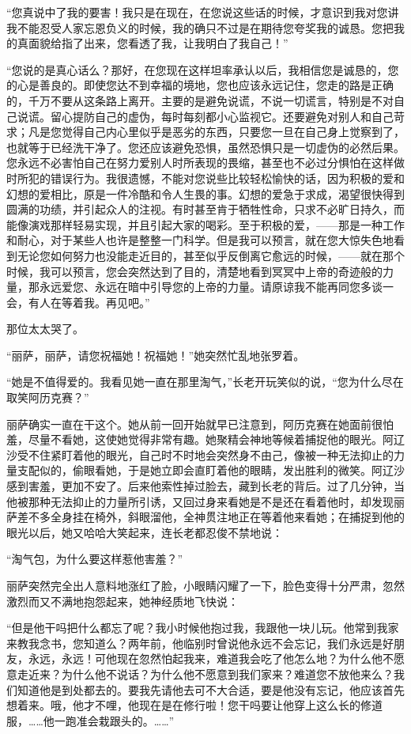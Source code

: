 \par “您真说中了我的要害！我只是在现在，在您说这些话的时候，才意识到我对您讲我不能忍受人家忘恩负义的时候，我的确只不过是在期待您夸奖我的诚恳。您把我的真面貌给指了出来，您看透了我，让我明白了我自己！”
\par “您说的是真心话么？那好，在您现在这样坦率承认以后，我相信您是诚恳的，您的心是善良的。即使您达不到幸福的境地，您也应该永远记住，您走的路是正确的，千万不要从这条路上离开。主要的是避免说谎，不说一切谎言，特别是不对自己说谎。留心提防自己的虚伪，每时每刻都小心监视它。还要避免对别人和自己苛求；凡是您觉得自己内心里似乎是恶劣的东西，只要您一旦在自己身上觉察到了，也就等于已经洗干净了。您还应该避免恐惧，虽然恐惧只是一切虚伪的必然后果。您永远不必害怕自己在努力爱别人时所表现的畏缩，甚至也不必过分惧怕在这样做时所犯的错误行为。我很遗憾，不能对您说些比较轻松愉快的话，因为积极的爱和幻想的爱相比，原是一件冷酷和令人生畏的事。幻想的爱急于求成，渴望很快得到圆满的功绩，并引起众人的注视。有时甚至肯于牺牲性命，只求不必旷日持久，而能像演戏那样轻易实现，并且引起大家的喝彩。至于积极的爱，——那是一种工作和耐心，对于某些人也许是整整一门科学。但是我可以预言，就在您大惊失色地看到无论您如何努力也没能走近目的，甚至似乎反倒离它愈远的时候，——就在那个时候，我可以预言，您会突然达到了目的，清楚地看到冥冥中上帝的奇迹般的力量，那永远爱您、永远在暗中引导您的上帝的力量。请原谅我不能再同您多谈一会，有人在等着我。再见吧。”
\par 那位太太哭了。
\par “丽萨，丽萨，请您祝福她！祝福她！”她突然忙乱地张罗着。
\par “她是不值得爱的。我看见她一直在那里淘气，”长老开玩笑似的说，“您为什么尽在取笑阿历克赛？”
\par 丽萨确实一直在干这个。她从前一回开始就早已注意到，阿历克赛在她面前很怕羞，尽量不看她，这使她觉得非常有趣。她聚精会神地等候着捕捉他的眼光。阿辽沙受不住紧盯着他的眼光，自己时不时地会突然身不由己，像被一种无法抑止的力量支配似的，偷眼看她，于是她立即会直盯着他的眼睛，发出胜利的微笑。阿辽沙感到害羞，更加不安了。后来他索性掉过脸去，藏到长老的背后。过了几分钟，当他被那种无法抑止的力量所引诱，又回过身来看她是不是还在看着他时，却发现丽萨差不多全身挂在椅外，斜眼溜他，全神贯注地正在等着他来看她；在捕捉到他的眼光以后，她又哈哈大笑起来，连长老都忍俊不禁地说：
\par “淘气包，为什么要这样惹他害羞？”
\par 丽萨突然完全出人意料地涨红了脸，小眼睛闪耀了一下，脸色变得十分严肃，忽然激烈而又不满地抱怨起来，她神经质地飞快说：
\par “但是他干吗把什么都忘了呢？我小时候他抱过我，我跟他一块儿玩。他常到我家来教我念书，您知道么？两年前，他临别时曾说他永远不会忘记，我们永远是好朋友，永远，永远！可他现在忽然怕起我来，难道我会吃了他怎么地？为什么他不愿意走近来？为什么他不说话？为什么他不愿意到我们家来？难道您不放他来么？我们知道他是到处都去的。要我先请他去可不大合适，要是他没有忘记，他应该首先想着来。哦，他才不哩，他现在是在修行啦！您干吗要让他穿上这么长的修道服，……他一跑准会栽跟头的。……”
